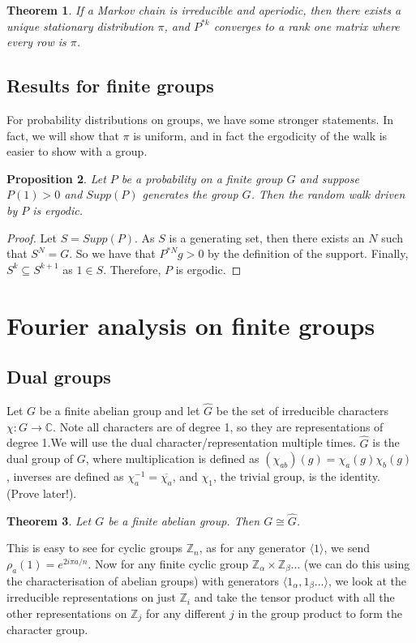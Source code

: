 \documentclass[]{article}
\newtheorem{theorem}{Theorem}
\newtheorem{proposition}[theorem]{Proposition}
\theoremstyle{definition}
\numberwithin{theorem}{section}
\numberwithin{equation}{section}
\begin{document}
\begin{theorem}
	If a Markov chain is irreducible and aperiodic, then there exists a unique stationary distribution $\pi$, and $P^{*k}$ converges to a rank one matrix where every row is $\pi$. 
\end{theorem}


\subsection{Results for finite groups}
For probability distributions on groups, we have some stronger statements. In fact, we will show that $\pi$ is uniform, and in fact the ergodicity of the walk is easier to show with a group. 
\begin{proposition}
	Let $P$ be a probability on a finite group $G$ and suppose $P(1) > 0$ and $Supp(P)$ generates the group $G$. Then the random walk driven by $P$ is ergodic.
\end{proposition}

\begin{proof}
	Let $S = Supp(P)$. As $S$ is a generating set, then there exists an $N$ such that $S^N = G$. So we have that $P^{\ast N} g > 0$ by the definition of the support. Finally, $S^{k} \subseteq S^{k + 1}$ as $1 \in S$. Therefore, $P$ is ergodic. 
\end{proof}
\section{Fourier analysis on finite groups}
\subsection{Dual groups}
Let $G$ be a finite abelian group and let $\widehat{G}$ be the set of irreducible characters $\chi: G \rightarrow \mathbb{C}$. Note all characters are of degree 1, so they are representations of degree 1.We will use the dual character/representation multiple times. $\widehat{G}$ is the dual group of $G$, where multiplication is defined as $(\chi_{ab})(g) = \chi_a(g)\chi_b(g)$, inverses are defined as $\chi_a^{-1} = \overline{\chi_a}$, and $\chi_1$, the trivial group, is the identity. (Prove later!).

\begin{theorem}
	Let $G$ be a finite abelian group. Then $G \cong \widehat{G}$.
\end{theorem}
This is easy to see for cyclic groups $\mathbb{Z}_n$, as for any generator $\langle 1 \rangle$, we send $\rho_a(1) = e^{2 i \pi a / n}$. Now for any finite cyclic group $\mathbb{Z}_{\alpha} \times \mathbb{Z}_{\beta}... $ (we can do this using the characterisation of abelian groups) with generators $\langle 1_{\alpha}, 1_\beta... \rangle$, we look at the irreducible representations on just $\mathbb{Z}_{i}$ and take the tensor product with all the other representations on $\mathbb{Z}_j$ for any different $j$ in the group product to form the character group. 
\end{document}
